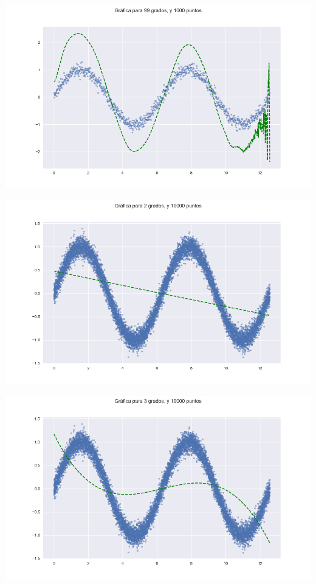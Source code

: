 \documentclass{article}
\begin{document}
\begin{enumerate}
\begin{itemize}
\begin{center}
            \includegraphics[width=\textwidth]{Ajuste991000.png}
        
            \includegraphics[width=\textwidth]{Ajuste210000.png}
        
            \includegraphics[width=\textwidth]{Ajuste310000.png}
        

\end{center}
\end{itemize}
\end{enumerate}
\end{document}
